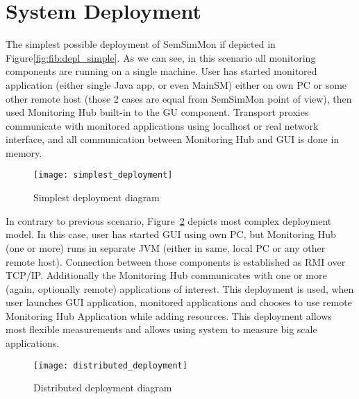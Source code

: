 %


\section{System Deployment}
\label{sec:deployments}

The simplest possible deployment of SemSimMon if depicted in Figure\ref{fig:fib:depl_simple}. As we can see, in this scenario all monitoring components are running on a single machine. User has started monitored application (either single Java app, or even MainSM) either on own PC or some other remote host (those 2 cases are equal from SemSimMon point of view), then used Monitoring Hub built-in to the GU component. Transport proxies communicate with monitored applications using localhost or real network interface, and all communication between Monitoring Hub and GUI is done in memory.

\begin{figure}[h]
   \centering
   \texttt{[image: simplest\_deployment]}
   \caption{Simplest deployment diagram}
   \label{fib:depl_simple}
 \end{figure}
 
In contrary to previous scenario, Figure~\ref{fig:depl_complex} depicts most complex deployment model. In this case, user has started GUI using own PC, but Monitoring Hub (one or more) runs in separate JVM (either in same, local PC or any other remote host). Connection between those components is established as RMI over TCP/IP. Additionally the Monitoring Hub communicates with one or more (again, optionally remote) applications of interest. This deployment is used, when user launches GUI application, monitored applications and chooses to use remote Monitoring Hub Application while adding resources. This deployment allows most flexible measurements and allows using system to measure big scale applications.

\begin{figure}[h]
   \centering
   \texttt{[image: distributed\_deployment]}
   \caption{Distributed deployment diagram}
   \label{fig:depl_complex}
 \end{figure}
